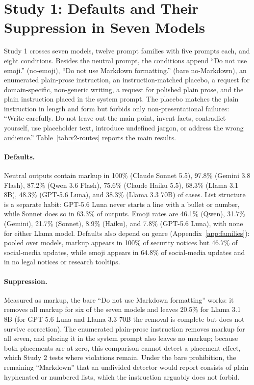 \documentclass[acmsmall,screen,review,anonymous]{acmart}
\begin{document}
\section{Study 1: Defaults and Their Suppression in Seven Models}
\label{sec:study1}

Study 1 crosses seven models, twelve prompt families with five prompts each, and eight conditions. Besides the neutral prompt, the conditions append ``Do not use emoji.'' (no-emoji), ``Do not use Markdown formatting.'' (bare no-Markdown), an enumerated plain-prose instruction, an instruction-matched placebo, a request for domain-specific, non-generic writing, a request for polished plain prose, and the plain instruction placed in the system prompt. The placebo matches the plain instruction in length and form but forbids only non-presentational failures: ``Write carefully. Do not leave out the main point, invent facts, contradict yourself, use placeholder text, introduce undefined jargon, or address the wrong audience.'' Table~\ref{tab:v2-routes} reports the main results.



\paragraph{Defaults.} Neutral outputs contain markup in 100\% (Claude Sonnet 5.5), 97.8\% (Gemini 3.8 Flash), 87.2\% (Qwen 3.6 Flash), 75.6\% (Claude Haiku 5.5), 68.3\% (Llama 3.1 8B), 48.3\% (GPT-5.6 Luna), and 38.3\% (Llama 3.3 70B) of cases. List structure is a separate habit: GPT-5.6 Luna never starts a line with a bullet or number, while Sonnet does so in 63.3\% of outputs. Emoji rates are 46.1\% (Qwen), 31.7\% (Gemini), 21.7\% (Sonnet), 8.9\% (Haiku), and 7.8\% (GPT-5.6 Luna), with none for either Llama model. Defaults also depend on genre (Appendix~\ref{app:families}): pooled over models, markup appears in 100\% of security notices but 46.7\% of social-media updates, while emoji appears in 64.8\% of social-media updates and in no legal notices or research tooltips.

\paragraph{Suppression.} Measured as markup, the bare ``Do not use Markdown formatting'' works: it removes all markup for six of the seven models and leaves 20.5\% for Llama 3.1 8B (for GPT-5.6 Luna and Llama 3.3 70B the removal is complete but does not survive correction). The enumerated plain-prose instruction removes markup for all seven, and placing it in the system prompt also leaves no markup; because both placements are at zero, this comparison cannot detect a placement effect, which Study 2 tests where violations remain. Under the bare prohibition, the remaining ``Markdown'' that an undivided detector would report consists of plain hyphenated or numbered lists, which the instruction arguably does not forbid.
\end{document}
